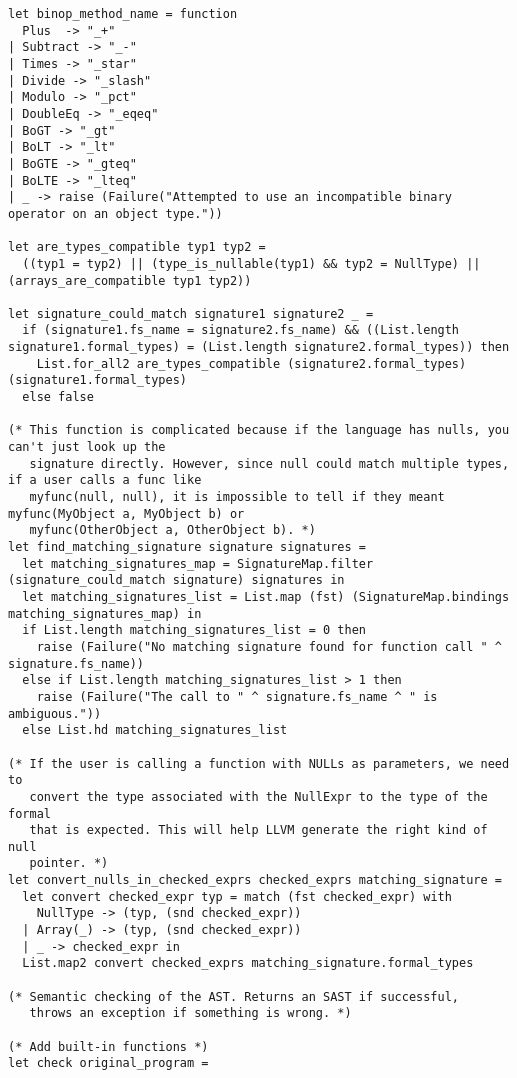 \documentclass{article}
\begin{document}
\begin{verbatim}
let binop_method_name = function
  Plus  -> "_+"
| Subtract -> "_-"
| Times -> "_star"
| Divide -> "_slash"
| Modulo -> "_pct"
| DoubleEq -> "_eqeq"
| BoGT -> "_gt"
| BoLT -> "_lt"
| BoGTE -> "_gteq"
| BoLTE -> "_lteq"
| _ -> raise (Failure("Attempted to use an incompatible binary operator on an object type."))

let are_types_compatible typ1 typ2 =
  ((typ1 = typ2) || (type_is_nullable(typ1) && typ2 = NullType) || (arrays_are_compatible typ1 typ2))

let signature_could_match signature1 signature2 _ =
  if (signature1.fs_name = signature2.fs_name) && ((List.length signature1.formal_types) = (List.length signature2.formal_types)) then
    List.for_all2 are_types_compatible (signature2.formal_types) (signature1.formal_types)
  else false

(* This function is complicated because if the language has nulls, you can't just look up the
   signature directly. However, since null could match multiple types, if a user calls a func like
   myfunc(null, null), it is impossible to tell if they meant myfunc(MyObject a, MyObject b) or
   myfunc(OtherObject a, OtherObject b). *)
let find_matching_signature signature signatures =
  let matching_signatures_map = SignatureMap.filter (signature_could_match signature) signatures in
  let matching_signatures_list = List.map (fst) (SignatureMap.bindings matching_signatures_map) in
  if List.length matching_signatures_list = 0 then
    raise (Failure("No matching signature found for function call " ^ signature.fs_name))
  else if List.length matching_signatures_list > 1 then
    raise (Failure("The call to " ^ signature.fs_name ^ " is ambiguous."))
  else List.hd matching_signatures_list

(* If the user is calling a function with NULLs as parameters, we need to
   convert the type associated with the NullExpr to the type of the formal
   that is expected. This will help LLVM generate the right kind of null
   pointer. *)
let convert_nulls_in_checked_exprs checked_exprs matching_signature =
  let convert checked_expr typ = match (fst checked_expr) with
    NullType -> (typ, (snd checked_expr))
  | Array(_) -> (typ, (snd checked_expr))
  | _ -> checked_expr in
  List.map2 convert checked_exprs matching_signature.formal_types

(* Semantic checking of the AST. Returns an SAST if successful,
   throws an exception if something is wrong. *)

(* Add built-in functions *)
let check original_program =


\end{verbatim}
\end{document}
